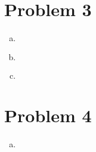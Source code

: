 \documentclass{article}
\begin{document}
\begin{flushleft}
\begin{enumerate}[(a)]
\begin{multline*}\\

\end{multline*}

	

\end{enumerate}



	\section*{Problem 3}

	

\begin{enumerate}[(a)]

	\item 

\begin{multline*}\\

\end{multline*}

	

	\item 

\begin{multline*}\\

\end{multline*}



	\item 

\begin{multline*}\\

\end{multline*}

	

\end{enumerate}



	\section*{Problem 4}

	

\begin{enumerate}[(a)]

	

	\item 	

\begin{multline*}\\


\end{multline*}
\end{enumerate}
\end{flushleft}
\end{document}
